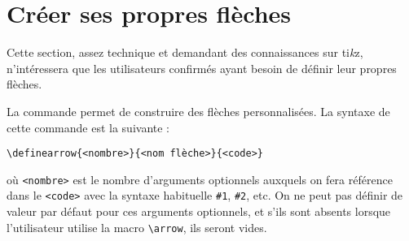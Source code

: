 \documentclass[10pt]{article}
\makeatletter
\newcommand\idx{\@ifstar{\let\print@or@not\@gobble\idx@}{\let\print@or@not\@firstofone\idx@}}
\newcommand\idx@[1]{%
	\ifcat\expandafter\noexpand\@car#1\@nil\relax%
		\expandafter\ifx\@car#1\@nil\protect
			\index{#1}%
			\print@or@not{#1}%
		\else
			\saveexpandmode\expandarg
			\StrSubstitute{\string#1}{\string @}{\@empty\protect\symbol{'100}}[\temp@]%
			\StrGobbleLeft\temp@1[\temp@]%
			\restoreexpandmode
			\expandafter\index\expandafter{\temp@ @\protect\texttt{\protect\textbackslash\temp@}}%
			\print@or@not{\texttt{\string#1}}%
		\fi
	\else
		\index{#1}%
		\print@or@not{#1}%
	\fi
}
\newcommand\TIKZ{ti\textit kz\xspace}
\makeatother
\begin{document}
\section{Créer ses propres flèches}\label{definearrow}
Cette section, assez technique et demandant des connaissances sur \TIKZ, n'intéressera que les utilisateurs confirmés ayant besoin de définir leur propres flèches.

La commande \idx{\definearrow} permet de construire des flèches personnalisées. La syntaxe de cette commande est la suivante :

\hfill\verb-\definearrow{<nombre>}{<nom flèche>}{<code>}-\hfill\null

où \verb-<nombre>- est le nombre d'arguments optionnels auxquels on fera référence dans le \verb-<code>- avec la syntaxe habituelle \verb-#1-, \verb-#2-, etc. On ne peut pas définir de valeur par défaut pour ces arguments optionnels, et s'ils sont absents lorsque l'utilisateur utilise la macro \verb-\arrow-, ils seront vides.
\end{document}
